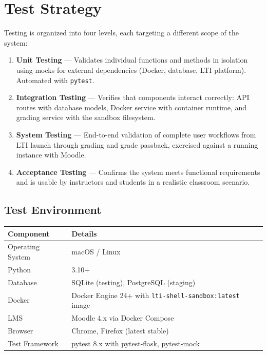 \documentclass[12pt, letterpaper]{article}
\begin{document}
\section{Test Strategy}

Testing is organized into four levels, each targeting a different scope of the system:

\begin{enumerate}
    \item \textbf{Unit Testing} --- Validates individual functions and methods in isolation using mocks for external dependencies (Docker, database, LTI platform). Automated with \texttt{pytest}.
    \item \textbf{Integration Testing} --- Verifies that components interact correctly: API routes with database models, Docker service with container runtime, and grading service with the sandbox filesystem.
    \item \textbf{System Testing} --- End-to-end validation of complete user workflows from LTI launch through grading and grade passback, exercised against a running instance with Moodle.
    \item \textbf{Acceptance Testing} --- Confirms the system meets functional requirements and is usable by instructors and students in a realistic classroom scenario.
\end{enumerate}

\subsection{Test Environment}

\begin{longtable}{p{3.5cm} p{10cm}}
    \toprule
    \textbf{Component} & \textbf{Details} \\
    \midrule
    Operating System & macOS / Linux \\
    Python & 3.10+ \\
    Database & SQLite (testing), PostgreSQL (staging) \\
    Docker & Docker Engine 24+ with \texttt{lti-shell-sandbox:latest} image \\
    LMS & Moodle 4.x via Docker Compose \\
    Browser & Chrome, Firefox (latest stable) \\
    Test Framework & pytest 8.x with pytest-flask, pytest-mock \\
    \bottomrule
\end{longtable}
\end{document}

